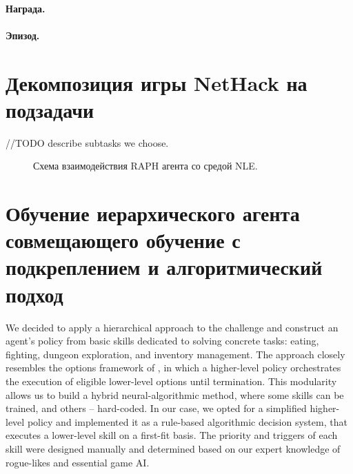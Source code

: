 \paragraph{Награда.}

\paragraph{Эпизод.}


\section{Декомпозиция игры NetHack на подзадачи}

//TODO describe subtasks we choose. 

\begin{figure}[ht]
\caption{Схема взаимодействия RAPH агента со средой NLE.}
    \label{fig:raph_nle}
\end{figure}


\section{Обучение иерархического агента совмещающего обучение с подкреплением и алгоритмический подход}


We decided to apply a hierarchical approach to the challenge and construct an agent's policy from basic skills dedicated to solving concrete tasks: eating, fighting, dungeon exploration, and inventory management. The approach closely resembles the options framework of \cite{Sutton1999}, in which a higher-level policy orchestrates the execution of eligible lower-level options until termination. This modularity allows us to build a hybrid neural-algorithmic method, where some skills can be trained, and others -- hard-coded.
%
In our case, we opted for a simplified higher-level policy and implemented it as a rule-based algorithmic decision system, that executes a lower-level skill on a first-fit basis. The priority and triggers of each skill were designed manually and determined based on our expert knowledge of rogue-likes and essential game AI.

